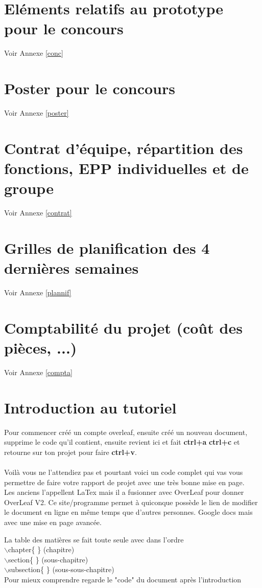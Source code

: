\documentclass{report}
\begin{document}
\chapter{Eléments relatifs au prototype pour le concours}
Voir Annexe \ref{conc}

\chapter{Poster pour le concours}
Voir Annexe \ref{poster}

\chapter{Contrat d’équipe, répartition des fonctions, EPP individuelles et de groupe}
Voir Annexe \ref{contrat}

\chapter{Grilles de planification des 4 dernières semaines}
Voir Annexe \ref{plannif}

\chapter{Comptabilité du projet (coût des pièces, ...)}
Voir Annexe \ref{compta}

\chapter{Introduction au tutoriel}

Pour commencer créé un compte overleaf, ensuite créé un nouveau document, supprime le code qu'il contient, ensuite revient ici et fait \textbf{ctrl+a} \textbf{ctrl+c} et retourne sur ton projet pour faire \textbf{ctrl+v}.\\
\\
Voilà vous ne l'attendiez pas et pourtant voici un code complet qui vas vous permettre de faire votre rapport de projet avec une très bonne mise en page.\\
Les anciens l'appellent LaTex mais il a fusionner avec OverLeaf pour donner OverLeaf V2. Ce site/programme permet à quiconque possède le lien de modifier le document en ligne en même temps que d'autres personnes. Google docs mais avec une mise en page avancée. 

La table des matières se fait toute seule avec dans l'ordre\\ $\backslash$chapter\{  \} (chapitre)\\
$\backslash$section\{  \} (sous-chapitre)\\
$\backslash$subsection\{  \} (sous-sous-chapitre)\\
Pour mieux comprendre regarde le
"code" du document après l'introduction
\end{document}
